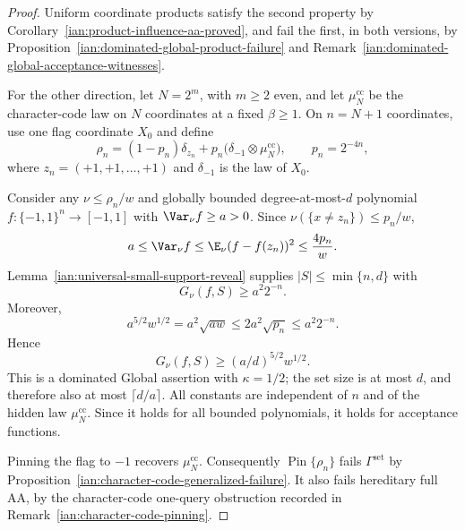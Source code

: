 \begin{proof}
Uniform coordinate products satisfy the second property by
Corollary~\ref{ian:product-influence-aa-proved}, and fail the first,
in both versions, by
Proposition~\ref{ian:dominated-global-product-failure} and
Remark~\ref{ian:dominated-global-acceptance-witnesses}.

For the other direction, let \(N=2^m\), with \(m\ge2\) even, and let
\(\mu^{\mathrm{cc}}_N\) be the character-code law on \(N\) coordinates
at a fixed \(\beta\ge1\). On \(n=N+1\) coordinates, use one flag
coordinate \(X_0\) and define
\[
 \rho_n=(1-p_n)\delta_{z_n}
       +p_n\bigl(\delta_{-1}\otimes\mu^{\mathrm{cc}}_N\bigr),
 \qquad
 p_n=2^{-4n},
\]
where \(z_n=(+1,+1,\ldots,+1)\) and \(\delta_{-1}\) is the law of
\(X_0\).

Consider any \(\nu\le\rho_n/w\) and globally bounded
degree-at-most-\(d\) polynomial \(f:\{-1,1\}^n\to[-1,1]\) with
\(\Var_\nu f\ge a>0\). Since \(\nu(\{x\ne z_n\})\le p_n/w\),
\[
 a\le\Var_\nu f
 \le\E_\nu(f-f(z_n))^2
 \le\frac{4p_n}{w}.
\]
Lemma~\ref{ian:universal-small-support-reveal} supplies
\(|S|\le\min\{n,d\}\) with
\[
 G_\nu(f,S)\ge a^2 2^{-n}.
\]
Moreover,
\[
 a^{5/2}w^{1/2}
 =a^2\sqrt{aw}
 \le2a^2\sqrt{p_n}
 \le a^2 2^{-n}.
\]
Hence
\[
 G_\nu(f,S)\ge(a/d)^{5/2}w^{1/2}.
\]
This is a dominated Global assertion with \(\kappa=1/2\);
the set size is at most \(d\), and therefore also at most
\(\lceil d/a\rceil\). All constants are independent of \(n\) and
of the hidden law \(\mu^{\mathrm{cc}}_N\). Since it holds for all
bounded polynomials, it holds for acceptance functions.

Pinning the flag to \(-1\) recovers \(\mu^{\mathrm{cc}}_N\). Consequently
\(\operatorname{Pin}\{\rho_n\}\) fails
\(\Gamma^{\mathrm{set}}\) by
Proposition~\ref{ian:character-code-generalized-failure}.
It also fails hereditary full AA, by the character-code
one-query obstruction recorded in
Remark~\ref{ian:character-code-pinning}.
\end{proof}

